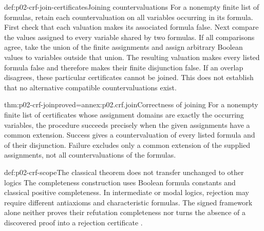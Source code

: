 \begin{hbmethod}{def:p02-crf-join-certificates}{Joining countervaluations}
For a nonempty finite list of formulas, retain each countervaluation on all
variables occurring in its formula. First check that each valuation
makes its associated formula false. Next compare the values assigned
to every variable shared by two formulas. If all comparisons agree,
take the union of the finite assignments and assign arbitrary Boolean
values to variables outside that union. The resulting valuation makes
every listed formula false and therefore makes their finite disjunction
false. If an overlap disagrees, these particular certificates cannot be
joined. This does not establish that no alternative compatible
countervaluations exist.
\end{hbmethod}

\begin{hbtheorem}{thm:p02-crf-join}{proved=annex:p02.crf.join}{Correctness of joining}
For a nonempty finite list of certificates whose assignment domains are exactly the occurring
variables, the procedure succeeds precisely when the given assignments
have a common extension. Success gives a countervaluation of every
listed formula and of their disjunction. Failure excludes only a common
extension of the supplied assignments, not all countervaluations of the
formulas.
\end{hbtheorem}

\begin{proofboundary}{def:p02-crf-scope}{The classical theorem does not transfer unchanged to other logics}
The completeness construction uses Boolean formula constants and
classical positive completeness. In intermediate or modal logics,
rejection may require different antiaxioms and characteristic formulas.
The signed framework alone neither proves their refutation
completeness nor turns the absence of a discovered proof into a
rejection certificate \cite[\S1 and Definitions~4.1--4.3]{Citkin2013JankovRefutation}.
\end{proofboundary}
